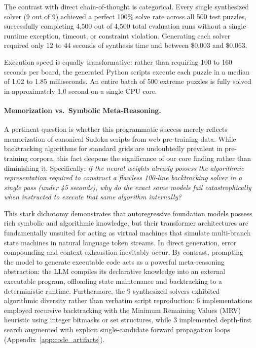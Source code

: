 \documentclass{article} %
\begin{document}
The contrast with direct chain-of-thought is categorical. Every single synthesized solver (9 out of 9) achieved a perfect 100\% solve rate across all 500 test puzzles, successfully completing 4,500 out of 4,500 total evaluation runs without a single runtime exception, timeout, or constraint violation. Generating each solver required only 12 to 44 seconds of synthesis time and between \$0.003 and \$0.063.

Execution speed is equally transformative: rather than requiring 100 to 160 seconds per board, the generated Python scripts execute each puzzle in a median of 1.02 to 1.85 milliseconds. An entire batch of 500 extreme puzzles is fully solved in approximately 1.0 second on a single CPU core. 

\paragraph{Memorization vs.\ Symbolic Meta-Reasoning.} A pertinent question is whether this programmatic success merely reflects memorization of canonical Sudoku scripts from web pre-training data. While backtracking algorithms for standard grids are undoubtedly prevalent in pre-training corpora, this fact deepens the significance of our core finding rather than diminishing it. Specifically: \textit{if the neural weights already possess the algorithmic representation required to construct a flawless 100-line backtracking solver in a single pass (under 45 seconds), why do the exact same models fail catastrophically when instructed to execute that same algorithm internally?} 

This stark dichotomy demonstrates that autoregressive foundation models possess rich symbolic and algorithmic knowledge, but their transformer architectures are fundamentally unsuited for acting as virtual machines that simulate multi-branch state machines in natural language token streams. In direct generation, error compounding \citep{Dziri2023FaithFate} and context exhaustion inevitably occur. By contrast, prompting the model to generate executable code acts as a powerful meta-reasoning abstraction: the LLM compiles its declarative knowledge into an external executable program, offloading state maintenance and backtracking to a deterministic runtime. Furthermore, the 9 synthesized solvers exhibited algorithmic diversity rather than verbatim script reproduction: 6 implementations employed recursive backtracking with the Minimum Remaining Values (MRV) heuristic using integer bitmasks or set structures, while 3 implemented depth-first search augmented with explicit single-candidate forward propagation loops (Appendix~\ref{app:code_artifacts}).
\end{document}
